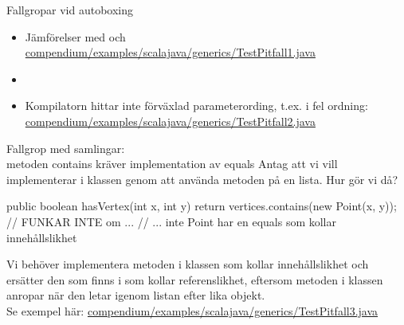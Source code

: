 \begin{Slide}{Fallgropar vid autoboxing}
\begin{itemize}
\item Jämförelser med \code{==} och \code{!=} \\
\href{https://github.com/lunduniversity/introprog/blob/master/compendium/examples/scalajava/generics/TestPitfall1.java}
{\SlideFontSmall  compendium/examples/scalajava/generics/TestPitfall1.java}
\item[]
\item Kompilatorn hittar inte förväxlad parameterording, t.ex.  i fel ordning: \sout{}\\
\href{https://github.com/lunduniversity/introprog/blob/master/compendium/examples/scalajava/generics/TestPitfall2.java}
{\SlideFontSmall compendium/examples/scalajava/generics/TestPitfall2.java}
\end{itemize}
\end{Slide}

\begin{Slide}{Fallgrop med samlingar: \\ metoden contains kräver implementation av equals}\SlideFontSmall
Antag att vi vill implementerar   i klassen  genom att använda metoden  på en lista. Hur gör vi då?
\pause
\begin{Code}[numberstyle=,language=Java]
public boolean hasVertex(int x, int y){  
    return vertices.contains(new Point(x, y)); // FUNKAR INTE om ...
    // ... inte Point har en equals som kollar innehållslikhet
}
\end{Code}
Vi behöver implementera metoden  i klassen  som kollar innehållslikhet och ersätter den  som finns i  som kollar referenslikhet, eftersom metoden  i klassen  anropar  när den letar igenom listan efter lika objekt. \\
Se exempel här: \href{https://github.com/lunduniversity/introprog/tree/master/compendium/examples/scalajava/generics/TestPitfall3.java}{compendium/examples/scalajava/generics/TestPitfall3.java} \\


\end{Slide}


